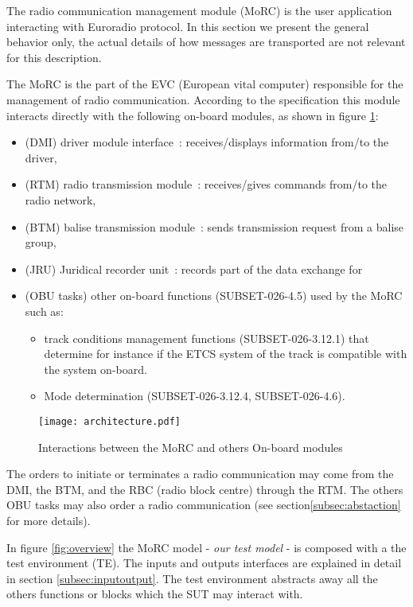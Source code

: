 The radio communication management module (MoRC) is the user application interacting
with Euroradio protocol. In this section we present the general behavior only, 
the actual details of how messages are transported are not relevant
for this description.

The MoRC is the part of the EVC (European vital computer) responsible for the
management of radio communication.
According to the specification this module interacts directly with the following
on-board modules, as shown in figure \ref{fig:arch}: 
\begin{itemize}
\item (DMI) driver module interface~: receives/displays information from/to the driver,
\item (RTM) radio transmission module~: receives/gives commands from/to the radio
network,
\item (BTM) balise transmission module~: sends transmission request from a balise group,
\item (JRU) Juridical recorder unit~: records part of the data exchange for
\item (OBU tasks) other on-board functions (SUBSET-026-4.5) used  by the MoRC such as:
\begin{itemize}
\item track conditions management functions  (SUBSET-026-3.12.1)
that determine for instance if the ETCS system of the track is compatible with the
system on-board.
\item Mode determination (SUBSET-026-3.12.4, SUBSET-026-4.6).

\end{itemize}
\end{itemize}

\begin{figure}[htpb]
\centering
\texttt{[image: architecture.pdf]}
\caption{\label{fig:arch}Interactions between the MoRC and others On-board modules}
\end{figure}

The orders to initiate or terminates a radio communication may come from the
DMI, the BTM, and the RBC (radio block centre) through the RTM. The others OBU
tasks may also order a radio communication (see section\ref{subsec:abstaction}
for more details).

In figure \ref{fig:overview} the MoRC model - \emph{our test model} - is composed
with a the test environment (TE). The inputs and outputs
interfaces are explained in detail in section \ref{subsec:inputoutput}.
The test environment abstracts away all the others functions or blocks  which
the SUT may interact with.

